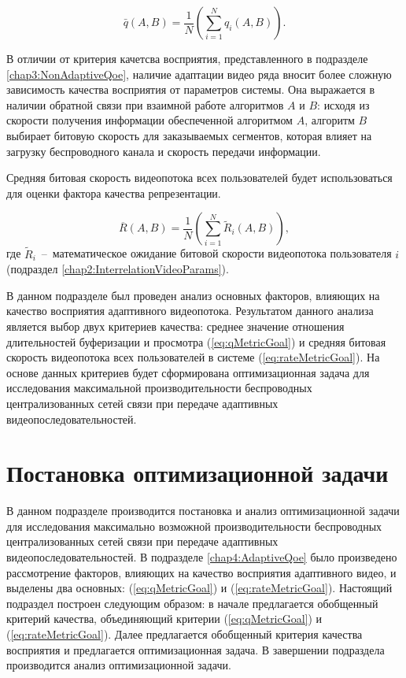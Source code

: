 \begin{equation}
	\label{eq:qMetricGoal}
	\bar{q}\left(A, B\right)=\frac{1}{N}\left(\sum\limits_{i=1}^{N} {q_i\left(A,B\right)}\right).
\end{equation}

В отличии от критерия качетсва восприятия, представленного в подразделе \ref{chap3:NonAdaptiveQoe}, наличие адаптации видео ряда вносит более сложную зависимость качества восприятия от параметров системы. Она выражается в наличии обратной связи при взаимной работе алгоритмов $A$ и $B$: исходя из скорости получения информации обеспеченной алгоритмом $A$, алгоритм $B$ выбирает битовую скорость для заказываемых сегментов, которая влияет на загрузку беспроводного канала и скорость передачи информации.

Средняя битовая скорость видеопотока всех пользователей будет использоваться для оценки фактора качества репрезентации.

\begin{equation}
	\label{eq:rateMetricGoal}
	\overline{R}\left(A,B\right) = \frac{1}{N}\left(\sum\limits_{i=1}^{N} {\tilde{R}_i\left(A,B\right)}\right),
\end{equation}
где $\tilde{R}_i$~--~математическое ожидание битовой скорости видеопотока пользователя $i$ (подраздел \ref{chap2:InterrelationVideoParams}).

В данном подразделе был проведен анализ основных факторов, влияющих на качество восприятия адаптивного видеопотока. Результатом данного анализа является выбор двух критериев качества: среднее значение отношения длительностей буферизации и просмотра (\ref{eq:qMetricGoal}) и средняя битовая скорость видеопотока всех пользователей в системе (\ref{eq:rateMetricGoal}). На основе данных критериев будет сформирована оптимизационная задача для исследования максимальной производительности беспроводных централизованных сетей связи при передаче адаптивных видеопоследовательностей.

\section{Постановка оптимизационной задачи}
\label{chap4:AdaptiveOptimizationProblem}

В данном подразделе производится постановка и анализ оптимизационной задачи для исследования максимально возможной производительности беспроводных централизованных сетей связи при передаче адаптивных видеопоследовательностей. В подразделе \ref{chap4:AdaptiveQoe} было произведено рассмотрение факторов, влияющих на качество восприятия адаптивного видео, и выделены два основных: (\ref{eq:qMetricGoal}) и (\ref{eq:rateMetricGoal}). Настоящий подраздел построен следующим образом: в начале предлагается обобщенный критерий качества, объединяющий критерии (\ref{eq:qMetricGoal}) и (\ref{eq:rateMetricGoal}). Далее предлагается обобщенный критерия качества восприятия и предлагается оптимизационная задача. В завершении подраздела производится анализ оптимизационной задачи.


